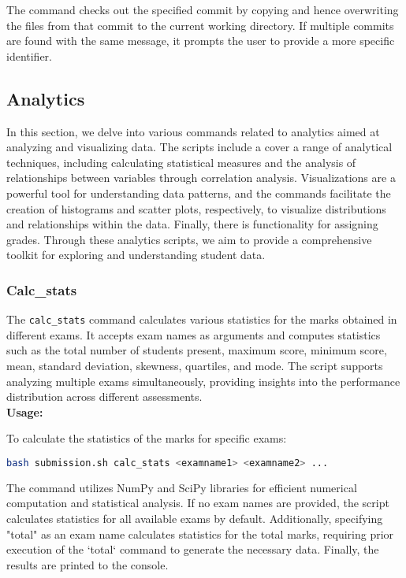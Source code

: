 \documentclass{article}
\begin{document}
The command checks out the specified commit by copying and hence overwriting the files from that commit to the current working directory. If multiple commits are found with the same message, it prompts the user to provide a more specific identifier.

\subsection{Analytics}

In this section, we delve into various commands related to analytics aimed at analyzing and visualizing data. The scripts include a cover a range of analytical techniques, including calculating statistical measures and the analysis of relationships between variables through correlation analysis. Visualizations are a powerful tool for understanding data patterns, and the commands facilitate the creation of histograms and scatter plots, respectively, to visualize distributions and relationships within the data. Finally, there is functionality for assigning grades. Through these analytics scripts, we aim to provide a comprehensive toolkit for exploring and understanding student data.


\subsubsection{Calc\_stats}
The \texttt{calc\_stats} command calculates various statistics for the marks obtained in different exams. It accepts exam names as arguments and computes statistics such as the total number of students present, maximum score, minimum score, mean, standard deviation, skewness, quartiles, and mode. The script supports analyzing multiple exams simultaneously, providing insights into the performance distribution across different assessments.\\
\textbf{Usage:}
\begin{adjustwidth}{0.5cm}{0cm}
To calculate the statistics of the marks for specific exams:
\begin{lstlisting}[language=bash]
bash submission.sh calc_stats <examname1> <examname2> ...
\end{lstlisting}
\end{adjustwidth}

The command utilizes NumPy and SciPy libraries for efficient numerical computation and statistical analysis. If no exam names are provided, the script calculates statistics for all available exams by default. Additionally, specifying "total" as an exam name calculates statistics for the total marks, requiring prior execution of the `total` command to generate the necessary data.  Finally, the results are printed to the console.
\end{document}
